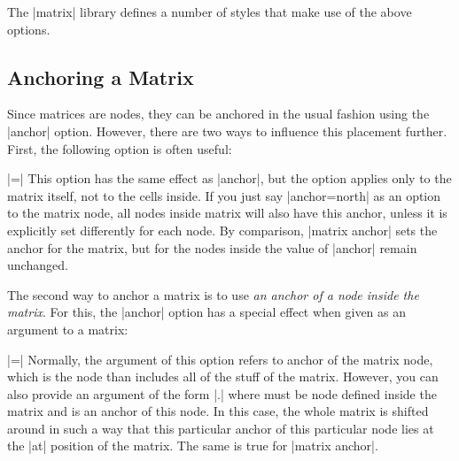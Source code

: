 The |matrix| library defines a number of styles that make use of the
above options.





\subsection{Anchoring a Matrix}

Since matrices are nodes, they can be anchored in the usual fashion
using the |anchor| option. However, there are two ways to influence
this placement further. First, the following option is often useful:

\begin{itemize}
  |=|
  This option has the same effect as |anchor|, but the option applies
  only to the matrix itself, not to the cells inside. If you just say
  |anchor=north| as an option to the matrix node, all nodes inside
  matrix will also have this anchor, unless it is explicitly set
  differently for each node. By comparison, |matrix anchor| sets the
  anchor for the matrix, but for the nodes inside the value of
  |anchor| remain unchanged.

\begin{codeexample}[]
\end{codeexample}
\end{itemize}

The second way to anchor a matrix is to use \emph{an anchor of a node
  inside the matrix}. For this, the |anchor| option has a special
effect when given as an argument to a matrix:

\begin{itemize}
  |=|
  Normally, the argument of this option refers to anchor of the matrix
  node, which is the node than includes all of the stuff of the
  matrix. However, you can also provide an argument of the form
  |.| where  must be node defined
  inside the matrix and  is an anchor of this node. In
  this case, the whole matrix is shifted around in such a way that
  this particular anchor of this particular node lies at the |at|
  position of the matrix. The same is true for |matrix anchor|.
\end{itemize}


